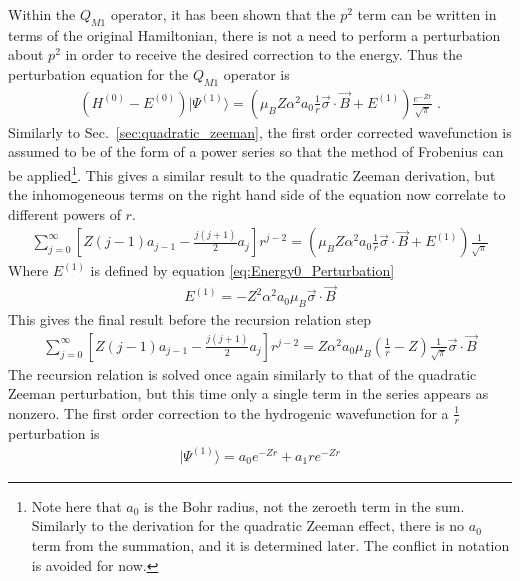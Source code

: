             Within the $Q_{M1}$ operator, it has been shown that the $p^2$ term can be written in terms of the original Hamiltonian, there is not a need to perform a perturbation about $p^2$ in order to receive the desired correction to the energy. Thus the perturbation equation for the $Q_{M1}$ operator is
            \begin{align}
                \left(H^{(0)} - E^{(0)}\right) \vert \varPsi^{(1)}\rangle = \left(\mu_B Z \alpha^2 a_0 \frac{1}{r} \vec{\sigma} \cdot \vec{B} + E^{(1)} \right) \frac{e^{-Zr}}{\sqrt{\pi}}\;.
            \end{align}
            \noindent Similarly to Sec.~\ref{sec:quadratic_zeeman}, the first order corrected wavefunction is assumed to be of the form of a power series so that the method of Frobenius can be applied\footnote{Note here that $a_0$ is the Bohr radius, not the zeroeth term in the sum. Similarly to the derivation for the quadratic Zeeman effect, there is no $a_0$ term from the summation, and it is determined later. The conflict in notation is avoided for now.}. This gives a similar result to the quadratic Zeeman derivation, but the inhomogeneous terms on the right hand side of the equation now correlate to different powers of $r$.
            \begin{align}
                \sum_{j = 0}^\infty \left[ Z(j-1)a_{j-1} - \frac{j(j+1)}{2} a_j \right] r^{j -2} = \left(\mu_B Z \alpha^2 a_0 \frac{1}{r} \vec{\sigma} \cdot \vec{B} + E^{(1)} \right) \frac{1}{\sqrt{\pi}}
            \end{align}
            \noindent Where $E^{(1)}$ is defined by equation \eqref{eq:Energy0_Perturbation}
            \begin{align}
                E^{(1)} = - Z^2 \alpha^2 a_0 \mu_B \vec{\sigma} \cdot \vec{B}
            \end{align}
            \noindent This gives the final result before the recursion relation step
            \begin{align}
                \sum_{j = 0}^\infty \left[ Z(j-1)a_{j-1} - \frac{j(j+1)}{2} a_j \right] r^{j -2} =  Z \alpha^2 a_0 \mu_B \left(\frac{1}{r} - Z \right) \frac{1}{\sqrt{\pi}}\vec{\sigma} \cdot \vec{B}
            \end{align}
            \noindent The recursion relation is solved once again similarly to that of the quadratic Zeeman perturbation, but this time only a single term in the series appears as nonzero. The first order correction to the hydrogenic wavefunction for a $\frac{1}{r}$ perturbation is 
            \begin{align}
                \vert \varPsi^{(1)} \rangle = a_0 e^{-Zr} + a_1 re^{-Zr}
            \end{align}

